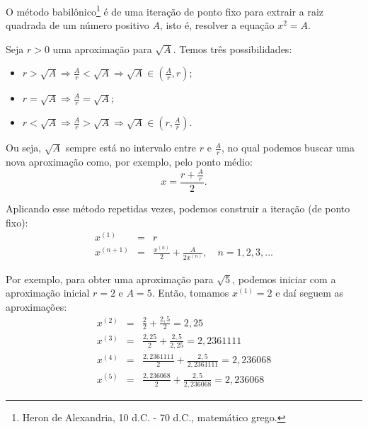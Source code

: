 \begin{ex}
O método babilônico\footnote{Heron de Alexandria, 10 d.C. - 70 d.C., matemático grego.} é de uma iteração de ponto fixo para extrair a raiz quadrada de um número positivo $A$, isto é, resolver a equação $x^2 = A$.

Seja $r>0$ uma aproximação para $\sqrt{A}$. Temos três possibilidades:
\begin{itemize}
\item $r>\sqrt{A} \Longrightarrow \frac{A}{r}<\sqrt{A} \Longrightarrow \sqrt{A}\in \left(\frac{A}{r}, r\right);$
\item $r=\sqrt{A} \Longrightarrow \frac{A}{r}=\sqrt{A};$
\item $r<\sqrt{A} \Longrightarrow \frac{A}{r}>\sqrt{A} \Longrightarrow \sqrt{A}\in \left(r, \frac{A}{r}\right).$
\end{itemize}
Ou seja, $\sqrt{A}$ sempre está no intervalo entre $r$ e $\frac{A}{r}$, no qual podemos buscar uma nova aproximação como, por exemplo, pelo ponto médio:
\begin{equation} x=\frac{r+\frac{A}{r}}{2}. \end{equation}

Aplicando esse método repetidas vezes, podemos construir a iteração (de ponto fixo):
\begin{eqnarray}
x^{(1)}&=&r \\
x^{(n+1)}&=&\frac{x^{(n)}}{2}+\frac{A}{2x^{(n)}}, \quad n=1,2,3,...
\end{eqnarray}

Por exemplo, para obter uma aproximação para $\sqrt{5}$, podemos iniciar com a aproximação inicial $r=2$ e $A=5$. Então, tomamos $x^{(1)} = 2$ e daí seguem as aproximações:
\begin{eqnarray}
x^{(2)}&=&\frac{2}{2}+\frac{2,5}{2} = 2,25\\
x^{(3)}&=&\frac{2,25}{2}+\frac{2,5}{2,25}= 2,2361111  \\
x^{(4)}&=&\frac{2,2361111}{2}+\frac{2,5}{2,2361111}= 2,236068  \\
x^{(5)}&=&\frac{2,236068}{2}+\frac{2,5}{2,236068}= 2,236068
\end{eqnarray}
\end{ex}


